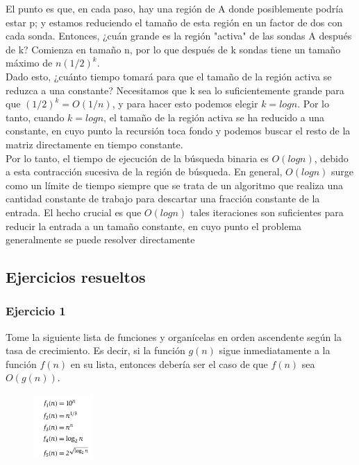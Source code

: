 \documentclass[a4paper]{article}
\begin{document}
El punto es que, en cada paso, hay una región de A donde posiblemente podría estar p; y
estamos reduciendo el tamaño de esta región en un factor de dos con cada sonda. Entonces, ¿cuán grande es la región "activa" de las sondas A después de k? Comienza en tamaño n, por lo que después de k sondas tiene un tamaño máximo de $n(1/2)^k$.\\

Dado esto, ¿cuánto tiempo tomará para que el tamaño de la región activa se reduzca a una
constante? Necesitamos que k sea lo suficientemente grande para que $(1/2)^k=O(1/n)$, y para hacer
esto podemos elegir $k=log n$. Por lo tanto, cuando $k=log n$, el tamaño de la región activa se ha
reducido a una constante, en cuyo punto la recursión toca fondo y podemos buscar el resto de la matriz
directamente en tiempo constante.\\

Por lo tanto, el tiempo de ejecución de la búsqueda binaria es $O(log n)$, debido a esta
contracción sucesiva de la región de búsqueda. En general, $O(log n)$ surge como un límite de tiempo
siempre que se trata de un algoritmo que realiza una cantidad constante de trabajo para descartar una
fracción constante de la entrada. El hecho crucial es que $O(log n)$ tales iteraciones son suficientes para
reducir la entrada a un tamaño constante, en cuyo punto el problema generalmente se puede resolver
directamente\\


\subsection{Ejercicios resueltos}

\subsubsection*{Ejercicio 1} 

Tome la siguiente lista de funciones y organícelas en orden ascendente según la tasa de crecimiento. Es decir, si la función $g(n)$ sigue inmediatamente a la función $f(n)$ en su lista, entonces debería ser el caso de que $f(n)$ sea $O(g(n))$.\\

\begin{figure}[h] 
  \centering
    \includegraphics[width=0.2\textwidth]{Imagenes-Seccion2/form2_1.PNG}
\end{figure}
\end{document}
